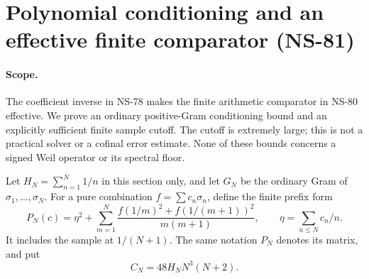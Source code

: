 \section{Polynomial conditioning and an effective finite comparator (NS-81)}
\label{sec:ns81-effective-sampling}

\paragraph{Scope.}
The coefficient inverse in NS-78 makes the finite arithmetic comparator
in NS-80 effective. We prove an ordinary positive-Gram conditioning bound
and an explicitly sufficient finite sample cutoff. The cutoff is extremely
large; this is not a practical solver or a cofinal error estimate. None of
these bounds concerns a signed Weil operator or its spectral floor.

Let $H_N=\sum_{n=1}^N1/n$ in this section only, and let $G_N$ be the
ordinary Gram of $\sigma_1,\ldots,\sigma_N$. For a pure combination
$f=\sum c_n\sigma_n$, define the finite prefix form
\[
 P_N(c)=\eta^2+\sum_{m=1}^N\frac{f(1/m)^2+f(1/(m+1))^2}{m(m+1)},
 \qquad \eta=\sum_{n\leq N}c_n/n.
\]
It includes the sample at $1/(N+1)$. The same notation $P_N$ denotes
its matrix, and put
\[
 C_N=48H_NN^3(N+2).
\]

